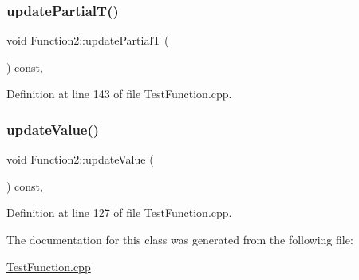 \subsubsection{\texorpdfstring{update\+Partial\+T()}{updatePartialT()}}
{\footnotesize\ttfamily void Function2\+::update\+PartialT (\begin{DoxyParamCaption}{ }\end{DoxyParamCaption}) const\hspace{0.3cm}{\ttfamily [inline]}, {\ttfamily [protected]}}



Definition at line 143 of file Test\+Function.\+cpp.

\hypertarget{classFunction2_ae491a20ff42d37d6512bc5b45b1a2566}{}\label{classFunction2_ae491a20ff42d37d6512bc5b45b1a2566} 
\subsubsection{\texorpdfstring{update\+Value()}{updateValue()}}
{\footnotesize\ttfamily void Function2\+::update\+Value (\begin{DoxyParamCaption}{ }\end{DoxyParamCaption}) const\hspace{0.3cm}{\ttfamily [inline]}, {\ttfamily [protected]}}



Definition at line 127 of file Test\+Function.\+cpp.



The documentation for this class was generated from the following file\+:\begin{DoxyCompactItemize}
\item 
\hyperlink{TestFunction_8cpp}{Test\+Function.\+cpp}\end{DoxyCompactItemize}

